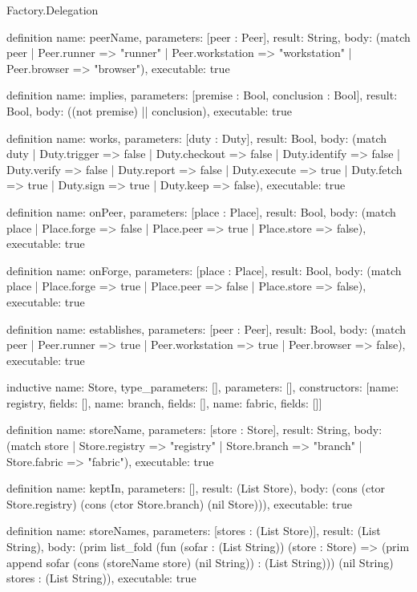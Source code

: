 \begin{lexlean}{Factory.Delegation}
\begin{semanticmodule}
definition{
  name: peerName,
  parameters: [peer : Peer],
  result: String,
  body: (match peer
    | Peer.runner => "runner"
    | Peer.workstation => "workstation"
    | Peer.browser => "browser"),
  executable: true
}

definition{
  name: implies,
  parameters: [premise : Bool, conclusion : Bool],
  result: Bool,
  body: ((not premise) || conclusion),
  executable: true
}

definition{
  name: works,
  parameters: [duty : Duty],
  result: Bool,
  body: (match duty
    | Duty.trigger => false
    | Duty.checkout => false
    | Duty.identify => false
    | Duty.verify => false
    | Duty.report => false
    | Duty.execute => true
    | Duty.fetch => true
    | Duty.sign => true
    | Duty.keep => false),
  executable: true
}

definition{
  name: onPeer,
  parameters: [place : Place],
  result: Bool,
  body: (match place
    | Place.forge => false
    | Place.peer => true
    | Place.store => false),
  executable: true
}

definition{
  name: onForge,
  parameters: [place : Place],
  result: Bool,
  body: (match place
    | Place.forge => true
    | Place.peer => false
    | Place.store => false),
  executable: true
}

definition{
  name: establishes,
  parameters: [peer : Peer],
  result: Bool,
  body: (match peer
    | Peer.runner => true
    | Peer.workstation => true
    | Peer.browser => false),
  executable: true
}

inductive{
  name: Store,
  type_parameters: [],
  parameters: [],
  constructors: [{name: registry, fields: []}, {name: branch, fields: []}, {name: fabric, fields: []}]
}

definition{
  name: storeName,
  parameters: [store : Store],
  result: String,
  body: (match store
    | Store.registry => "registry"
    | Store.branch => "branch"
    | Store.fabric => "fabric"),
  executable: true
}

definition{
  name: keptIn,
  parameters: [],
  result: (List Store),
  body: (cons (ctor Store.registry) (cons (ctor Store.branch) (nil Store))),
  executable: true
}

definition{
  name: storeNames,
  parameters: [stores : (List Store)],
  result: (List String),
  body: (prim list_fold (fun (sofar : (List String)) (store : Store) => (prim append sofar (cons (storeName store) (nil String)) : (List String))) (nil String) stores : (List String)),
  executable: true
}


\end{semanticmodule}
\end{lexlean}
